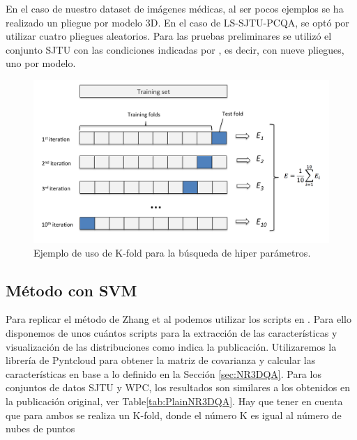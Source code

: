 En el caso de nuestro dataset de imágenes médicas, al ser pocos ejemplos 
se ha realizado un pliegue por modelo 3D. En el caso de LS-SJTU-PCQA\cite{ResSCNN},
se optó por utilizar cuatro pliegues aleatorios. Para las pruebas preliminares
se utilizó el conjunto SJTU\cite{SJTU} con las condiciones indicadas por 
\cite{ResSCNN}, es decir, con nueve pliegues, uno por modelo. 

\begin{figure}[htp]
 \begin{center}
   \includegraphics[width=\textwidth]{imagenes/chapter5/cross-validation}
 \end{center}
 \caption{Ejemplo de uso de K-fold para la búsqueda de hiper parámetros.}
 \label{fig:K-fold}
\end{figure}

\subsection{Método con SVM}
Para replicar el método de Zhang et al\cite{NR3DQA} podemos utilizar los 
scripts en . Para ello disponemos de unos cuántos scripts para la extracción de las características y visualización de las distribuciones 
como indica la publicación. 
Utilizaremos la librería de Pyntcloud para obtener 
la matriz de covarianza y calcular las características en base a lo definido 
en la Sección \ref{sec:NR3DQA}.
Para los conjuntos de datos SJTU\cite{SJTU} y WPC\cite{WPC1,WPC2}, los resultados 
son similares a los obtenidos en la publicación original, ver Table\ref{tab:PlainNR3DQA}.
Hay que tener en cuenta que para ambos se realiza un K-fold, donde el número 
K es igual al número de nubes de puntos 

